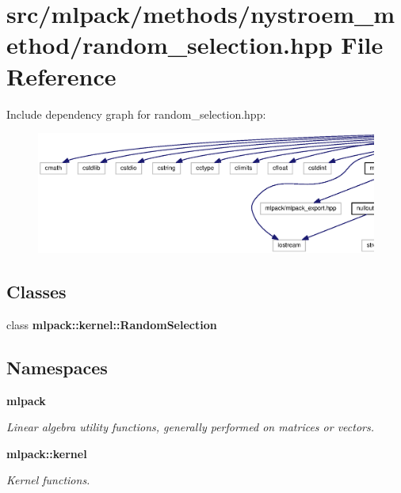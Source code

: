 \section{src/mlpack/methods/nystroem\+\_\+method/random\+\_\+selection.hpp File Reference}
\label{random__selection_8hpp}
Include dependency graph for random\+\_\+selection.\+hpp\+:
\nopagebreak
\begin{figure}[H]
\begin{center}
\leavevmode
\includegraphics[width=350pt]{random__selection_8hpp__incl}
\end{center}
\end{figure}
\subsection*{Classes}
\begin{DoxyCompactItemize}
\item 
class {\bf mlpack\+::kernel\+::\+Random\+Selection}
\end{DoxyCompactItemize}
\subsection*{Namespaces}
\begin{DoxyCompactItemize}
\item 
 {\bf mlpack}
\begin{DoxyCompactList}\small\item\em Linear algebra utility functions, generally performed on matrices or vectors. \end{DoxyCompactList}\item 
 {\bf mlpack\+::kernel}
\begin{DoxyCompactList}\small\item\em Kernel functions. \end{DoxyCompactList}\end{DoxyCompactItemize}


